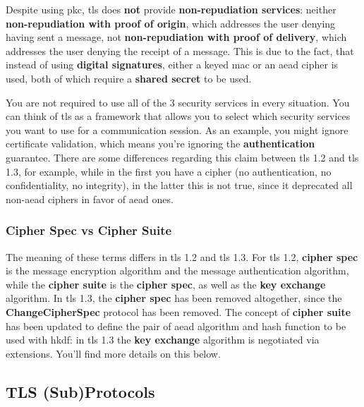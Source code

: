 \documentclass{llncs}
\begin{document}
Despite using \gls{pkc}, \gls{tls} does \textbf{not} provide \textbf{non-repudiation services}:
neither \textbf{non-repudiation with proof of origin}, which addresses the user denying
having sent a message, not \textbf{non-repudiation with proof of delivery}, which
addresses the user denying the receipt of a message. This is due to the fact, that
instead of using \textbf{digital signatures}, either a keyed \gls{mac} or an \gls{aead}
cipher is used, both of which require a \textbf{shared secret} to be used.

You are not required to use all of the 3 security services in every situation.
You can think of \gls{tls} as a framework that allows you to select which security
services you want to use for a communication session. As an example, you might
ignore certificate validation, which means you're ignoring the \textbf{authentication}
guarantee. There are some differences regarding this claim between \gls{tls} 1.2
and \gls{tls} 1.3, for example, while in the first you have a 
cipher (no authentication, no confidentiality, no integrity), in the latter
this is not true, since it deprecated all non-\gls{aead} ciphers in favor of
\gls{aead} ones.

\subsubsection{Cipher Spec vs Cipher Suite}

The meaning of these terms differs in \gls{tls} 1.2 and \gls{tls} 1.3. For \gls{tls} 1.2,
\textbf{cipher spec} is the message encryption algorithm and the message
authentication algorithm, while the \textbf{cipher suite} is the \textbf{cipher spec},
as well as the  \textbf{key exchange} algorithm. In \gls{tls} 1.3, the
 \textbf{cipher spec} has been removed altogether, since the  \textbf{ChangeCipherSpec}
 protocol has been removed. The concept of \textbf{cipher suite} has been updated
 to define the pair of \gls{aead} algorithm and hash function to be used with
 \gls{hkdf}: in \gls{tls} 1.3 the  \textbf{key exchange} algorithm is negotiated via
 extensions. You'll find more details on this below.

\subsection{TLS (Sub)Protocols}
\end{document}
